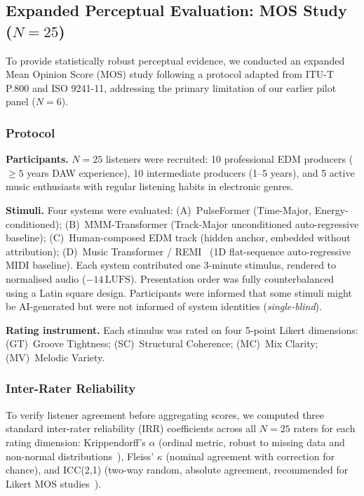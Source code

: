\documentclass[conference]{IEEEtran}
\begin{document}
\subsection{Expanded Perceptual Evaluation: MOS Study ($N=25$)}
\label{sec:mos}
To provide statistically robust perceptual evidence, we conducted an expanded Mean Opinion Score (MOS) study following a protocol adapted from ITU-T P.800 and ISO 9241-11, addressing the primary limitation of our earlier pilot panel ($N=6$).

\subsubsection*{Protocol}
\textbf{Participants.} $N=25$ listeners were recruited: 10 professional EDM producers ($\geq 5$ years DAW experience), 10 intermediate producers (1--5 years), and 5 active music enthusiasts with regular listening habits in electronic genres.

\textbf{Stimuli.} Four systems were evaluated:
(A)~PulseFormer (Time-Major, Energy-conditioned);
(B)~MMM-Transformer (Track-Major unconditioned auto-regressive baseline);
(C)~Human-composed EDM track (hidden anchor, embedded without attribution);
(D)~Music Transformer / REMI~\cite{huang2018music} (1D flat-sequence auto-regressive MIDI baseline).
Each system contributed one 3-minute stimulus, rendered to normalised audio ($-14\,\text{LUFS}$). Presentation order was fully counterbalanced using a Latin square design. Participants were informed that some stimuli might be AI-generated but were not informed of system identities (\textit{single-blind}).

\textbf{Rating instrument.} Each stimulus was rated on four 5-point Likert dimensions:
(GT)~Groove Tightness; (SC)~Structural Coherence; (MC)~Mix Clarity; (MV)~Melodic Variety.

\subsubsection*{Inter-Rater Reliability}
\label{sec:irr}

To verify listener agreement before aggregating scores, we computed three
standard inter-rater reliability (IRR) coefficients across all $N=25$ raters
for each rating dimension:
Krippendorff's $\alpha$ (ordinal metric, robust to missing data and
non-normal distributions~\cite{krippendorff2011computing}),
Fleiss' $\kappa$ (nominal agreement with correction for chance), and
ICC(2,1) (two-way random, absolute agreement,
recommended for Likert MOS studies~\cite{koo2016guideline}).
\end{document}
